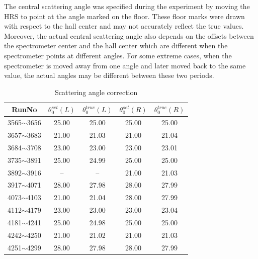 The central scattering angle was specified during the experiment by moving the HRS to point at the angle marked on the floor. These floor marks were drawn with respect to the hall center and may not accurately reflect the true values. Moreover, the actual central scattering angle also depends on the offsets between the spectrometer center and the hall center which are different when the spectrometer points at different angles. For some extreme cases, when the spectrometer is moved away from one angle and later moved back to the same value, the actual angles may be different between these two periods.
\begin{table}[!ht]
  \centering
  \begin{tabular}{|c||cccc|}
    \hline
    \textbf{RunNo} &$\theta^{set}_{0}(L)$&$\theta^{true}_{0}(L)$&$\theta^{set}_{0}(R)$&$\theta^{true}_{0}(R)$\\
    \hline \hline
    3565$\sim$3656          & 25.00 & 25.00  & 25.00 & 25.00 \\
    \hline
    3657$\sim$3683          & 21.00 & 21.03  & 21.00 & 21.04 \\
    \hline
     3684$\sim$3708         & 23.00 & 23.00  & 23.00 & 23.01 \\
    \hline
     3735$\sim$3891         & 25.00 & 24.99  & 25.00 & 25.00 \\
    \hline
     3892$\sim$3916         & --    &  --    & 21.00 & 21.03 \\
    \hline
     3917$\sim$4071         & 28.00 & 27.98  & 28.00 & 27.99 \\
    \hline
    4073$\sim$4103          & 21.00 & 21.04  & 28.00 & 27.99 \\
    \hline
    4112$\sim$4179          & 23.00 & 23.00  & 23.00 & 23.04 \\
    \hline
    4181$\sim$4241          & 25.00 & 24.98  & 25.00 & 25.00 \\
    \hline
    4242$\sim$4250          & 21.00 & 21.02  & 21.00 & 21.03 \\
    \hline    
    4251$\sim$4299          & 28.00 & 27.98  & 28.00 & 27.99 \\
    \hline
    \end{tabular}
  \caption{Scattering angle correction}
  \label{scat_angle_table}	
\end{table}

